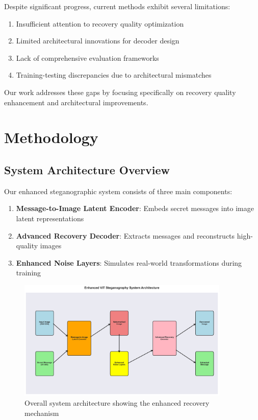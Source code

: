 \documentclass[12pt,a4paper]{report}
\begin{document}
Despite significant progress, current methods exhibit several limitations:

\begin{enumerate}
    \item Insufficient attention to recovery quality optimization
    \item Limited architectural innovations for decoder design
    \item Lack of comprehensive evaluation frameworks
    \item Training-testing discrepancies due to architectural mismatches
\end{enumerate}

Our work addresses these gaps by focusing specifically on recovery quality enhancement and architectural improvements.

\chapter{Methodology}
\label{ch:methodology}

\section{System Architecture Overview}

Our enhanced steganographic system consists of three main components:

\begin{enumerate}
    \item \textbf{Message-to-Image Latent Encoder}: Embeds secret messages into image latent representations
    \item \textbf{Advanced Recovery Decoder}: Extracts messages and reconstructs high-quality images
    \item \textbf{Enhanced Noise Layers}: Simulates real-world transformations during training
\end{enumerate}

\begin{figure}[H]
    \centering
    \includegraphics[width=0.9\textwidth]{figures/system_architecture.png}
    \caption{Overall system architecture showing the enhanced recovery mechanism}
    \label{fig:system_architecture}
\end{figure}
\end{document}
